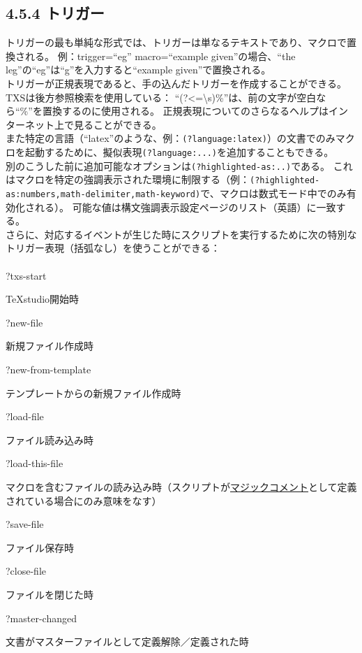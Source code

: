 \documentclass[]{book}
\begin{document}
\subsection{4.5.4 トリガー}

トリガーの最も単純な形式では、トリガーは単なるテキストであり、マクロで置換される。
例：trigger=``eg'' macro=``example given''の場合、``the
leg''の``eg''は``g''を入力すると``example given''で置換される。\\
トリガーが正規表現であると、手の込んだトリガーを作成することができる。
TXSは後方参照検索を使用している：
``(?\textless{}=\textbackslash{}s)\%''は、前の文字が空白なら``\%''を置換するのに使用される。
正規表現についてのさらなるヘルプはインターネット上で見ることができる。\\
また特定の言語（``latex''のような、例：\lstinline!(?language:latex)!）の文書でのみマクロを起動するために、擬似表現\lstinline!(?language:...)!を追加することもできる。\\
別のこうした前に追加可能なオプションは\lstinline!(?highlighted-as:..)!である。
これはマクロを特定の強調表示された環境に制限する（例：\lstinline!(?highlighted-as:numbers,math-delimiter,math-keyword)!で、マクロは数式モード中でのみ有効化される）。
可能な値は構文強調表示設定ページのリスト（英語）に一致する。\\
さらに、対応するイベントが生じた時にスクリプトを実行するために次の特別なトリガー表現（括弧なし）を使うことができる：\\\\

?txs-start

TeXstudio開始時

?new-file

新規ファイル作成時

?new-from-template

テンプレートからの新規ファイル作成時

?load-file

ファイル読み込み時

?load-this-file

マクロを含むファイルの読み込み時（スクリプトが\hyperref[SECTION\_TEXCOM]{マジックコメント}として定義されている場合にのみ意味をなす）

?save-file

ファイル保存時

?close-file

ファイルを閉じた時

?master-changed

文書がマスターファイルとして定義解除／定義された時
\end{document}
